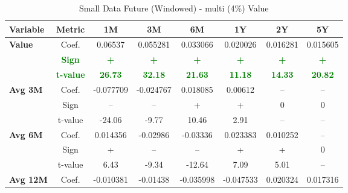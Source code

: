 \documentclass[11pt,english,a4paper,hidelinks]{book}
\begin{document}
\begin{table}[H]
    \centering
    \caption{Small Data Future (Windowed) - \acrshort{multi} (4\%) Value}
    \begin{tabular}{lccccccc}
        \toprule
        \textbf{Variable} & \textbf{Metric} & \textbf{1M} & \textbf{3M} & \textbf{6M} & \textbf{1Y} & \textbf{2Y} & \textbf{5Y} \\
        \midrule
        \multirow{3}{*}{\textbf{Value}}
            & Coef.   & 0.06537  & 0.055281 & 0.033066 & 0.020026 & 0.016281 & 0.015605 \\
            & \textbf{\textcolor{green}{Sign}}
                     & \textbf{\textcolor{green}{+}}
                     & \textbf{\textcolor{green}{+}}
                     & \textbf{\textcolor{green}{+}}
                     & \textbf{\textcolor{green}{+}}
                     & \textbf{\textcolor{green}{+}}
                     & \textbf{\textcolor{green}{+}} \\
            & \textbf{\textcolor{green}{t-value}}
                     & \textbf{\textcolor{green}{26.73}}
                     & \textbf{\textcolor{green}{32.18}}
                     & \textbf{\textcolor{green}{21.63}}
                     & \textbf{\textcolor{green}{11.18}}
                     & \textbf{\textcolor{green}{14.33}}
                     & \textbf{\textcolor{green}{20.82}} \\
        \cmidrule{1-8}
        \multirow{3}{*}{\textbf{Avg 3M}}
            & Coef.   & -0.077709 & -0.024767 & 0.018085  & 0.00612   & --        & --        \\
            & Sign    & –         & –         & +         & +         & 0         & 0         \\
            & t-value & -24.06    & -9.77     & 10.46     & 2.91      & --        & --        \\
        \cmidrule{1-8}
        \multirow{3}{*}{\textbf{Avg 6M}}
            & Coef.   & 0.014356  & -0.02986  & -0.03336  & 0.023383  & 0.010252  & --        \\
            & Sign    & +         & –         & –         & +         & +         & 0         \\
            & t-value & 6.43      & -9.34     & -12.64    & 7.09      & 5.01      & --        \\
        \cmidrule{1-8}
        \multirow{3}{*}{\textbf{Avg 12M}}
            & Coef.   & -0.010381 & -0.01438  & -0.035998 & -0.047533 & 0.020324  & 0.017316  \\

\end{tabular}
\end{table}
\end{document}
